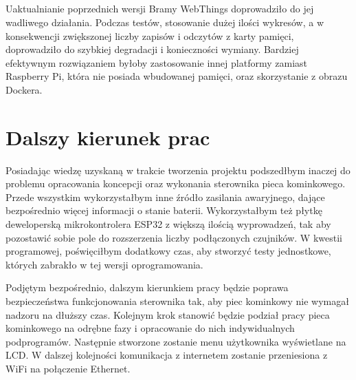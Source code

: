 \documentclass[11pt]{report}
\begin{document}
\section{}
Uaktualnianie poprzednich wersji Bramy WebThings doprowadziło do jej wadliwego działania.
Podczas testów, stosowanie dużej ilości wykresów, a w konsekwencji zwiększonej liczby zapisów i odczytów z karty pamięci, doprowadziło do szybkiej degradacji i konieczności wymiany.
Bardziej efektywnym rozwiązaniem byłoby zastosowanie innej platformy zamiast Raspberry Pi, która nie posiada wbudowanej pamięci, oraz skorzystanie z obrazu Dockera.
 
 \chapter{Dalszy kierunek prac}
Posiadając wiedzę uzyskaną w trakcie tworzenia projektu podszedłbym inaczej do problemu opracowania koncepcji oraz wykonania sterownika pieca kominkowego. Przede wszystkim wykorzystałbym inne źródło zasilania awaryjnego, dające bezpośrednio więcej informacji o stanie baterii. Wykorzystałbym też płytkę deweloperską mikrokontrolera ESP32 z większą ilością wyprowadzeń, tak aby pozostawić sobie pole do rozszerzenia liczby podłączonych czujników. W kwestii programowej, poświęciłbym dodatkowy czas, aby stworzyć testy jednostkowe, których zabrakło w tej wersji oprogramowania.

Podjętym bezpośrednio, dalszym kierunkiem pracy będzie poprawa bezpieczeństwa funkcjonowania sterownika tak, aby piec kominkowy nie wymagał nadzoru na dłuższy czas.
Kolejnym krok stanowić będzie podział pracy pieca kominkowego na odrębne fazy i opracowanie do nich indywidualnych podprogramów. Następnie stworzone zostanie menu użytkownika wyświetlane na LCD.
W dalszej kolejności komunikacja z internetem zostanie przeniesiona z WiFi na połączenie Ethernet.



 
 \newpage
 \printbibliography[title={Książki},type=book]
 
 \printbibliography[title={Artykuły},type=article]
 
 \printbibliography[title={Prace dyplomowe}, type=thesis]
 
 \printbibliography[title={Materiały konferencyjne},type=inproceedings]
 
 \printbibliography[title={Pozostałe źródła}, nottype=article, nottype=book, nottype=inproceedings, nottype=thesis]

 
\end{document}
